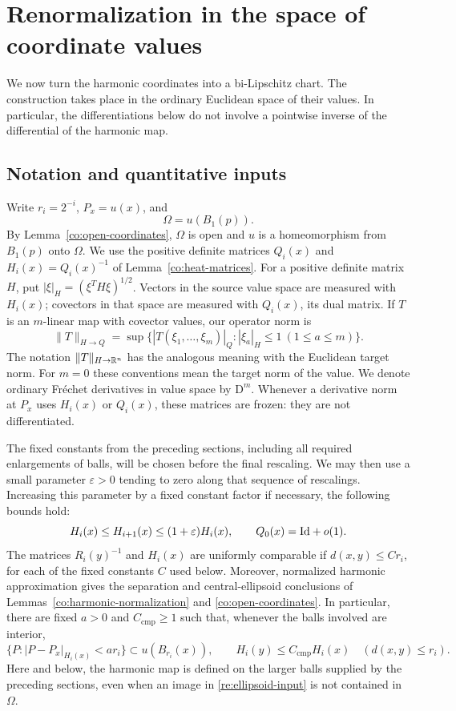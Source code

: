 \section{Renormalization in the space of coordinate values}
\label{re:section}

We now turn the harmonic coordinates into a bi-Lipschitz chart.  The
construction takes place in the ordinary Euclidean space of their values.
In particular, the differentiations below do not involve a pointwise inverse
of the differential of the harmonic map.

\subsection{Notation and quantitative inputs}
\label{re:input-data}

Write $r_i=2^{-i}$, $P_x=u(x)$, and
\[
  \Omega=u(B_1(p)).
\]
By Lemma~\ref{co:open-coordinates}, $\Omega$ is open and $u$ is a
homeomorphism from $B_1(p)$ onto $\Omega$.  We use the positive definite
matrices $Q_i(x)$ and $H_i(x)=Q_i(x)^{-1}$ of
Lemma~\ref{co:heat-matrices}.  For a positive definite matrix $H$,
put $|\xi|_H=(\xi^T H\xi)^{1/2}$.  Vectors in the source value space
are measured with $H_i(x)$; covectors in that space are measured with
$Q_i(x)$, its dual matrix.  If $T$ is an $m$-linear map with covector
values, our operator norm is
\[
 \|T\|_{H\to Q}
 =\sup\bigl\{|T(\xi_1,\ldots,\xi_m)|_Q:
                 |\xi_a|_H\le1\ (1\le a\le m)\bigr\}.
\]
The notation $\|T\|_{H\to\mathbb R^n}$ has the analogous meaning with the
Euclidean target norm.  For $m=0$ these conventions mean the target norm
of the value.  We denote ordinary Fr\'echet derivatives in value space
by $\mathrm D^m$.  Whenever a derivative norm at $P_x$ uses $H_i(x)$ or
$Q_i(x)$, these matrices are frozen: they are not differentiated.

The fixed constants from the preceding sections, including all required
enlargements of balls, will be chosen before the final rescaling.  We
may then use a small parameter $\varepsilon>0$ tending to zero along
that sequence of rescalings.  Increasing this parameter by a fixed
constant factor if necessary, the following bounds hold:
\begin{equation}
 \label{re:monotone-metrics}
 H_i(x)\le H_{i+1}(x)\le(1+\varepsilon)H_i(x),
 \qquad Q_0(x)=\mathrm{Id}+o(1).
\end{equation}
The matrices $R_i(y)^{-1}$ and $H_i(x)$ are uniformly comparable if
$d(x,y)\le C r_i$, for each of the fixed constants $C$ used below.
Moreover, normalized harmonic approximation gives the separation and
central-ellipsoid conclusions of
Lemmas~\ref{co:harmonic-normalization} and
\ref{co:open-coordinates}.  In particular, there are fixed $a>0$ and
$C_{\mathrm{cmp}}\ge1$ such that, whenever the balls involved are
interior,
\begin{equation}
 \label{re:ellipsoid-input}
 \{P:|P-P_x|_{H_i(x)}<a r_i\}
       \subset u(B_{r_i}(x)),
 \qquad H_i(y)\le C_{\mathrm{cmp}}H_i(x)
       \quad(d(x,y)\le r_i).
\end{equation}
Here and below, the harmonic map is defined on the larger balls supplied
by the preceding sections, even when an image in
\eqref{re:ellipsoid-input} is not contained in $\Omega$.

